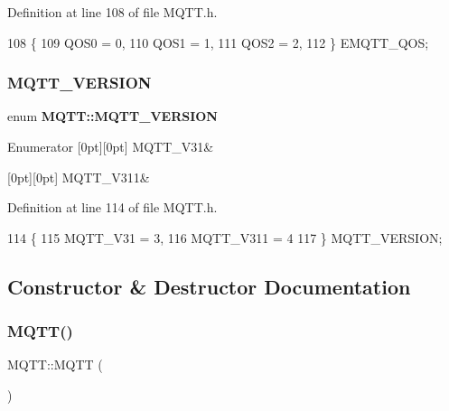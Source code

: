 Definition at line 108 of file M\+Q\+T\+T.\+h.


\begin{DoxyCode}
108              \{
109     QOS0 = 0,
110     QOS1 = 1,
111     QOS2 = 2,
112 \} EMQTT_QOS;
\end{DoxyCode}
\mbox{\label{class_m_q_t_t_a49430c9d6f68bbdc4e1bd039a6f5f97e}} 
\subsubsection{M\+Q\+T\+T\+\_\+\+V\+E\+R\+S\+I\+ON}
{\footnotesize\ttfamily enum \textbf{ M\+Q\+T\+T\+::\+M\+Q\+T\+T\+\_\+\+V\+E\+R\+S\+I\+ON}}

\begin{DoxyEnumFields}{Enumerator}
[0pt][0pt]{}\mbox{\label{class_m_q_t_t_a49430c9d6f68bbdc4e1bd039a6f5f97eaf955bab848df0e287c12f20b3af37885}} 
M\+Q\+T\+T\+\_\+\+V31&\\
\hline

[0pt][0pt]{}\mbox{\label{class_m_q_t_t_a49430c9d6f68bbdc4e1bd039a6f5f97eae61f66bbb0b315cf4cb7636684c68602}} 
M\+Q\+T\+T\+\_\+\+V311&\\
\hline

\end{DoxyEnumFields}


Definition at line 114 of file M\+Q\+T\+T.\+h.


\begin{DoxyCode}
114             \{
115     MQTT_V31 = 3,
116     MQTT_V311 = 4
117 \} MQTT_VERSION;
\end{DoxyCode}


\subsection{Constructor \& Destructor Documentation}
\mbox{\label{class_m_q_t_t_a75b5fb0489a6ecc75d75ed2362e60aef}} 
\subsubsection{M\+Q\+T\+T()\hspace{0.1cm}{\footnotesize\ttfamily [1/9]}}
{\footnotesize\ttfamily M\+Q\+T\+T\+::\+M\+Q\+TT (\begin{DoxyParamCaption}{ }\end{DoxyParamCaption})\hspace{0.3cm}{\ttfamily [inline]}}



